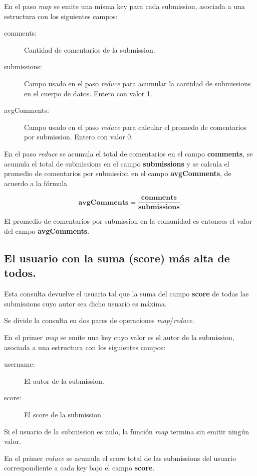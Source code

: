 \documentclass[a4paper,10pt,twoside]{article}
\newcommand{\map}{\emph{map}\xspace}
\newcommand{\reduce}{\emph{reduce}\xspace}
\begin{document}
En el paso \map se emite una misma key para cada submission, asociada a una estructura con los siguientes campos:

\begin{description}
	\item[comments:] Cantidad de comentarios de la submission.
	\item[submissions:] Campo usado en el paso \reduce para acumular la cantidad de submissions en el cuerpo de datos. Entero con valor 1.
	\item[avgComments:] Campo usado en el paso \reduce para calcular el promedo de comentarios por submission. Entero con valor 0.
\end{description}

En el paso \reduce se acumula el total de comentarios en el campo \textbf{comments}, se acumula el total de submissions en el campo \textbf{submissions} y se calcula el promedio de comentarios por submission en el campo \textbf{avgComments}, de acuerdo a la fórmula

$$\textbf{avgComments} = \frac{\textbf{comments}}{\textbf{submissions}}.$$

El promedio de comentarios por submission en la comunidad es entonces el valor del campo \textbf{avgComments}.


\subsection{El usuario con la suma (score) más alta de todos.}

Esta consulta devuelve el usuario tal que la suma del campo \textbf{score} de todas las submissions cuyo autor sea dicho usuario es máxima.

Se divide la consulta en dos pares de operaciones \map/\reduce.

En el primer \map se emite una key cuyo valor es el autor de la submission, asociada a una estructura con los siguientes campos:

\begin{description}
	\item[username:] El autor de la submission.
	\item[score:] El score de la submission.
\end{description}

Si el usuario de la submission es nulo, la función \map termina sin emitir ningún valor.

En el primer \reduce se acumula el score total de las submissions del usuario correspondiente a cada key bajo el campo \textbf{score}.
\end{document}
